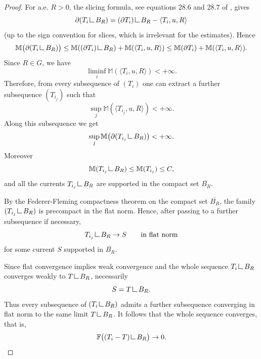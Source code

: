 \documentclass{article}
\numberwithin{equation}{section}
\theoremstyle{plain}%
\theoremstyle{definition}
\theoremstyle{definition}
\newcommand{\mrestr}{\mathop{\hbox{\vrule height 7pt width 0.5pt depth 0pt
\vrule height 0.5pt width 6pt depth 0pt}}\nolimits}
\begin{document}
\begin{proof}
For a.e. $R>0$, the slicing formula, see equations 28.6 and 28.7 of \cite{MR756417}, gives
$$
\partial(T_i\mrestr B_R)
=
(\partial T_i)\mrestr B_R - \langle T_i,u,R\rangle
$$
(up to the sign convention for slices, which is irrelevant for the estimates). Hence
$$
\mathbb M\bigl(\partial(T_i\mrestr B_R)\bigr)
\le
\mathbb M((\partial T_i)\mrestr B_R)
+
\mathbb M(\langle T_i,u,R\rangle)
\le
\mathbb M(\partial T_i)+\mathbb M(\langle T_i,u,R\rangle).
$$
Since $R\in G$, we have
$$
\liminf_i \mathbb M(\langle T_i,u,R\rangle)<+\infty.
$$
Therefore, from every subsequence of $(T_i)$ one can extract a further subsequence
$(T_{i_j})$ such that
$$
\sup_j \mathbb M(\langle T_{i_j},u,R\rangle)<+\infty.
$$
Along this subsequence we get
$$
\sup_j \mathbb M\bigl(\partial(T_{i_j}\mrestr B_R)\bigr)<+\infty.
$$
Moreover
$$
\mathbb M(T_{i_j}\mrestr B_R)\le \mathbb M(T_{i_j})\le C,
$$
and all the currents $T_{i_j}\mrestr B_R$ are supported in the compact set
$\overline{B_R}$.

By the Federer-Fleming compactness theorem on the compact set $\overline{B_R}$,
the family $(T_{i_j}\mrestr B_R)$ is precompact in the flat norm. Hence, after passing to a further subsequence if necessary,
$$
T_{i_j}\mrestr B_R \to S
\qquad \text{in flat norm}
$$
for some current $S$ supported in $\overline{B_R}$.

Since flat convergence implies weak convergence and the whole sequence
$T_i\mrestr B_R$ converges weakly to $T\mrestr B_R$, necessarily
$$
S=T\mrestr B_R.
$$
Thus every subsequence of $(T_i\mrestr B_R)$ admits a further subsequence converging in flat norm to the same limit $T\mrestr B_R$. It follows that the whole sequence converges, that is,
$$
\mathbb F\bigl((T_i-T)\mrestr B_R\bigr)\to 0.
$$
\end{proof}
\end{document}

